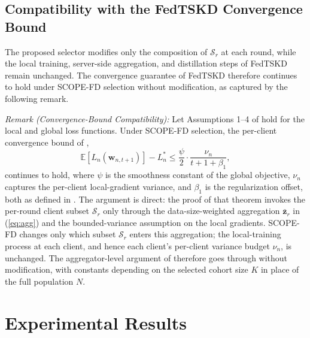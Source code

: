 \documentclass[journal]{IEEEtran}
\begin{document}
\subsection{Compatibility with the FedTSKD Convergence Bound}
\label{ssec:convergence-compat}

The proposed selector modifies only the composition of $\mathcal{S}_r$ at each round, while the local training, server-side aggregation, and distillation steps of FedTSKD \cite{mu2024fedtskd} remain unchanged. The convergence guarantee of FedTSKD therefore continues to hold under SCOPE-FD selection without modification, as captured by the following remark.

\textit{Remark (Convergence-Bound Compatibility):} Let Assumptions 1--4 of \cite{mu2024fedtskd} hold for the local and global loss functions. Under SCOPE-FD selection, the per-client convergence bound of \cite[Theorem~1]{mu2024fedtskd},
\begin{equation}
\mathbb{E}\!\left[L_n\!\left(\bm{w}_{n,t+1}\right)\right] - L_n^{*} \le \frac{\psi}{2}\cdot\frac{\nu_n}{t+1+\beta_1},
\label{eq:conv_bound}
\end{equation}
continues to hold, where $\psi$ is the smoothness constant of the global objective, $\nu_n$ captures the per-client local-gradient variance, and $\beta_1$ is the regularization offset, both as defined in \cite[Theorem~1]{mu2024fedtskd}. The argument is direct: the proof of that theorem invokes the per-round client subset $\mathcal{S}_r$ only through the data-size-weighted aggregation $\bar{\bm{z}}_r$ in (\ref{eq:agg}) and the bounded-variance assumption on the local gradients. SCOPE-FD changes only which subset $\mathcal{S}_r$ enters this aggregation; the local-training process at each client, and hence each client's per-client variance budget $\nu_n$, is unchanged. The aggregator-level argument of \cite{mu2024fedtskd} therefore goes through without modification, with constants depending on the selected cohort size $K$ in place of the full population $N$.


\section{Experimental Results}
\label{sec:experiments}
\end{document}

